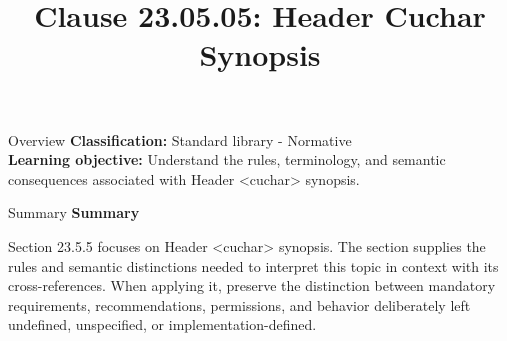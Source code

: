 \documentclass[10pt,letterpaper]{article}
\title{Clause 23.05.05: Header Cuchar Synopsis}
\author{}
\date{}
\begin{document}
\maketitle
\begin{CornellOverviewBox}{Overview}
\textbf{Classification:} Standard library - Normative\\[2pt]
\textbf{Learning objective:} Understand the rules, terminology, and semantic consequences associated with Header <cuchar> synopsis.
\end{CornellOverviewBox}\begin{CornellSummaryBox}{Summary}
{\sffamily\bfseries\color{Accent} Summary}\par\vspace{3pt}Section 23.5.5 focuses on Header <cuchar> synopsis. The section supplies the rules and semantic distinctions needed to interpret this topic in context with its cross-references. When applying it, preserve the distinction between mandatory requirements, recommendations, permissions, and behavior deliberately left undefined, unspecified, or implementation-defined.
\end{CornellSummaryBox}
\end{document}
